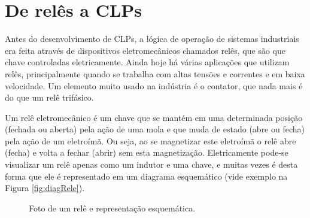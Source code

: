 \section{De relês a CLPs}

Antes do desenvolvimento de CLPs, a lógica de operação de sistemas industriais era feita através de dispositivos eletromecânicos chamados relês, que são que chave controladas eletricamente. Ainda hoje há várias aplicações que utilizam relês, principalmente quando se trabalha com altas tensões e correntes e em baixa velocidade. Um elemento muito usado na indústria é o contator, que nada mais é do que um relê trifásico.

Um relê eletromecânico é um chave que se mantém em uma determinada posição (fechada ou aberta) pela ação de uma mola e que muda de estado (abre ou fecha) pela ação de um eletroímã. Ou seja, ao se magnetizar este eletroímã o relê abre (fecha) e volta a fechar (abrir) sem esta magnetização. Eletricamente pode-se visualizar um relê apenas como um indutor e uma chave, e muitas vezes é desta forma que ele é representado em um diagrama esquemático (vide exemplo na Figura \ref{fig:diagRele}).

\begin{figure}[!h]
  \centering
  \caption{Foto de um relê e representação esquemática.}
\end{figure}

